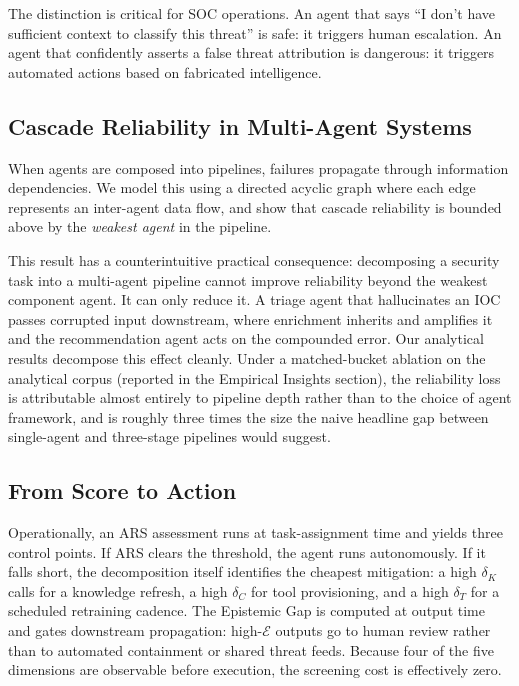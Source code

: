 \documentclass[journal,compsoc]{IEEEtran}
\begin{document}
The distinction is critical for SOC operations. An agent that says
``I don't have sufficient context to classify this threat'' is safe: it
triggers human escalation. An agent that confidently asserts a false threat
attribution is dangerous: it triggers automated actions based on fabricated
intelligence.

\subsection{Cascade Reliability in Multi-Agent Systems}

When agents are composed into pipelines, failures propagate through
information dependencies. We model this using a directed acyclic graph
where each edge represents an inter-agent data flow, and show that cascade
reliability is bounded above by the \textit{weakest agent} in the pipeline.

This result has a counterintuitive practical consequence: decomposing
a security task into a multi-agent pipeline cannot improve reliability
beyond the weakest component agent. It can only reduce it. A triage agent
that hallucinates an IOC passes corrupted input downstream, where
enrichment inherits and amplifies it and the recommendation agent acts
on the compounded error. Our analytical results decompose this effect
cleanly. Under a matched-bucket ablation on the analytical corpus
(reported in the Empirical Insights section),
the reliability loss is attributable almost entirely to pipeline depth
rather than to the choice of agent framework, and is roughly three
times the size the naive headline gap between single-agent and
three-stage pipelines would suggest.

\subsection{From Score to Action}

Operationally, an ARS assessment runs at task-assignment time and
yields three control points. If ARS clears the threshold, the agent
runs autonomously. If it falls short, the decomposition itself
identifies the cheapest mitigation: a high $\delta_K$ calls for a
knowledge refresh, a high $\delta_C$ for tool provisioning, and a
high $\delta_T$ for a scheduled retraining cadence. The Epistemic
Gap is computed at output time and gates downstream propagation:
high-$\mathcal{E}$ outputs go to human review rather than to
automated containment or shared threat feeds. Because four of the
five dimensions are observable before execution, the screening cost
is effectively zero.
\end{document}
